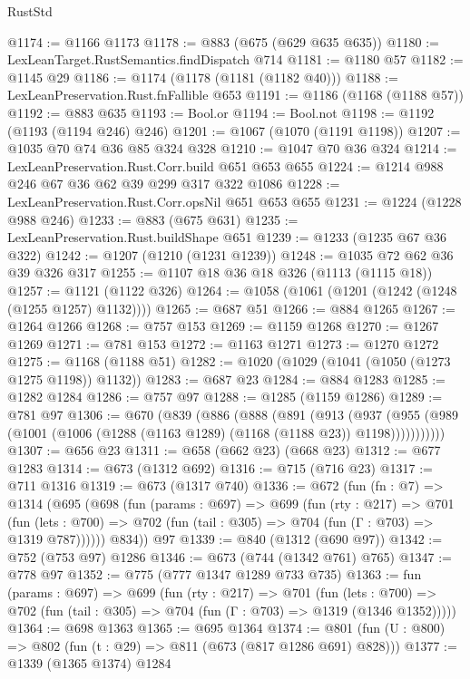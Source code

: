 \begin{lexlean}{RustStd}
\begin{coremodule}
{\begin{coremodule}
{{{{{{{{{{@1174 := @1166 @1173
@1178 := @883 (@675 (@629 @635 @635))
@1180 := LexLeanTarget.RustSemantics.findDispatch @714
@1181 := @1180 @57
@1182 := @1145 @29
@1186 := @1174 (@1178 (@1181 (@1182 @40)))
@1188 := LexLeanPreservation.Rust.fnFallible @653
@1191 := @1186 (@1168 (@1188 @57))
@1192 := @883 @635
@1193 := Bool.or
@1194 := Bool.not
@1198 := @1192 (@1193 (@1194 @246) @246)
@1201 := @1067 (@1070 (@1191 @1198))
@1207 := @1035 @70 @74 @36 @85 @324 @328
@1210 := @1047 @70 @36 @324
@1214 := LexLeanPreservation.Rust.Corr.build @651 @653 @655
@1224 := @1214 @988 @246 @67 @36 @62 @39 @299 @317 @322 @1086
@1228 := LexLeanPreservation.Rust.Corr.opsNil @651 @653 @655
@1231 := @1224 (@1228 @988 @246)
@1233 := @883 (@675 @631)
@1235 := LexLeanPreservation.Rust.buildShape @651
@1239 := @1233 (@1235 @67 @36 @322)
@1242 := @1207 (@1210 (@1231 @1239))
@1248 := @1035 @72 @62 @36 @39 @326 @317
@1255 := @1107 @18 @36 @18 @326 (@1113 (@1115 @18))
@1257 := @1121 (@1122 @326)
@1264 := @1058 (@1061 (@1201 (@1242 (@1248 (@1255 @1257) @1132))))
@1265 := @687 @51
@1266 := @884 @1265
@1267 := @1264 @1266
@1268 := @757 @153
@1269 := @1159 @1268
@1270 := @1267 @1269
@1271 := @781 @153
@1272 := @1163 @1271
@1273 := @1270 @1272
@1275 := @1168 (@1188 @51)
@1282 := @1020 (@1029 (@1041 (@1050 (@1273 @1275 @1198)) @1132))
@1283 := @687 @23
@1284 := @884 @1283
@1285 := @1282 @1284
@1286 := @757 @97
@1288 := @1285 (@1159 @1286)
@1289 := @781 @97
@1306 := @670
    (@839
      (@886
        (@888
          (@891
            (@913
              (@937
                (@955 (@989 (@1001 (@1006 (@1288 (@1163 @1289) (@1168 (@1188 @23)) @1198)))))))))))
@1307 := @656 @23
@1311 := @658 (@662 @23) (@668 @23)
@1312 := @677 @1283
@1314 := @673 (@1312 @692)
@1316 := @715 (@716 @23)
@1317 := @711 @1316
@1319 := @673 (@1317 @740)
@1336 := @672
    (fun (fn : @7) =>
    @1314
      (@695
        (@698
          (fun (params : @697) =>
          @699
            (fun (rty : @217) =>
            @701
              (fun (lets : @700) =>
              @702 (fun (tail : @305) => @704 (fun (Γ : @703) => @1319 @787))))))
        @834))
    @97
@1339 := @840 (@1312 (@690 @97))
@1342 := @752 (@753 @97) @1286
@1346 := @673 (@744 (@1342 @761) @765)
@1347 := @778 @97
@1352 := @775 (@777 @1347 @1289 @733 @735)
@1363 := fun (params : @697) =>
  @699
    (fun (rty : @217) =>
    @701
      (fun (lets : @700) =>
      @702 (fun (tail : @305) => @704 (fun (Γ : @703) => @1319 (@1346 @1352)))))
@1364 := @698 @1363
@1365 := @695 @1364
@1374 := @801 (fun (U : @800) => @802 (fun (t : @29) => @811 (@673 (@817 @1286 @691) @828)))
@1377 := @1339 (@1365 @1374) @1284
}}}}}}}}}}
\end{coremodule}}
\end{coremodule}
\end{lexlean}
